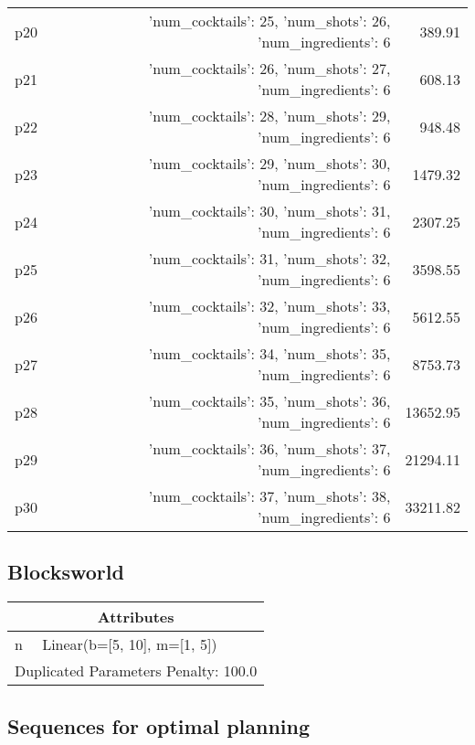 \documentclass{article}
\begin{document}
\begin{center}
\begin{tabular}{@{}l|r|r@{}}
  p20&{'num\_cocktails': 25, 'num\_shots': 26, 'num\_ingredients': 6}&389.91\\
  p21&{'num\_cocktails': 26, 'num\_shots': 27, 'num\_ingredients': 6}&608.13\\
  p22&{'num\_cocktails': 28, 'num\_shots': 29, 'num\_ingredients': 6}&948.48\\
  p23&{'num\_cocktails': 29, 'num\_shots': 30, 'num\_ingredients': 6}&1479.32\\
  p24&{'num\_cocktails': 30, 'num\_shots': 31, 'num\_ingredients': 6}&2307.25\\
  p25&{'num\_cocktails': 31, 'num\_shots': 32, 'num\_ingredients': 6}&3598.55\\
  p26&{'num\_cocktails': 32, 'num\_shots': 33, 'num\_ingredients': 6}&5612.55\\
  p27&{'num\_cocktails': 34, 'num\_shots': 35, 'num\_ingredients': 6}&8753.73\\
  p28&{'num\_cocktails': 35, 'num\_shots': 36, 'num\_ingredients': 6}&13652.95\\
  p29&{'num\_cocktails': 36, 'num\_shots': 37, 'num\_ingredients': 6}&21294.11\\
  p30&{'num\_cocktails': 37, 'num\_shots': 38, 'num\_ingredients': 6}&33211.82
                            \end{tabular}
                            \end{center}
                    
                            \newpage \subsection{Blocksworld}
                    \begin{center}
                    \begin{tabular}{@{}p{}p{}@{}}
                    \multicolumn{2}{c}{\bf \large Attributes}\\\midrule
                    n & Linear(b=[5, 10], m=[1, 5]) \\\midrule
                    \multicolumn{2}{l}{Duplicated Parameters Penalty: 100.0}
                    \end{tabular}
                    \end{center}
                
                            \subsection*{Sequences for optimal planning}
\end{document}
